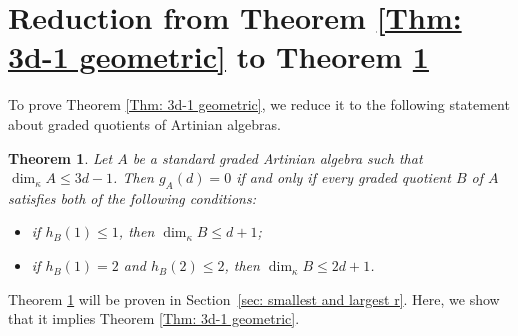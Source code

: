 \documentclass[11pt]{amsart}
\newtheorem{theorem}{Theorem}[section]
\theoremstyle{definition}
\newcommand{\dimk}{\dim_{\kappa}}
\begin{document}







\section{Reduction from Theorem \ref{Thm: 3d-1 geometric} to Theorem \ref{thm: 3d-1 artinian}}\label{sec: reduction from 1.8 to 3.1}


To prove Theorem \ref{Thm: 3d-1 geometric}, we reduce it to the following statement about graded quotients of Artinian algebras.
\begin{theorem}\label{thm: 3d-1 artinian}
Let $A$ be a standard graded Artinian algebra such that $\dimk A\leq 3d-1$. 
Then $g_A(d)=0$ if and only if
every graded quotient $B$ of $A$ satisfies both of the following conditions:
\begin{itemize}
    \item if $h_B(1)\leq 1$, then $\dimk B \leq d+1$;
    \item if $h_B(1)=2$ and $h_B(2) \leq 2$, then $\dimk B \leq 2d+1$.
\end{itemize}
\end{theorem}

Theorem \ref{thm: 3d-1 artinian} will be proven in Section~\ref{sec: smallest and largest r}. Here, we show that it implies Theorem \ref{Thm: 3d-1 geometric}.
\end{document}
